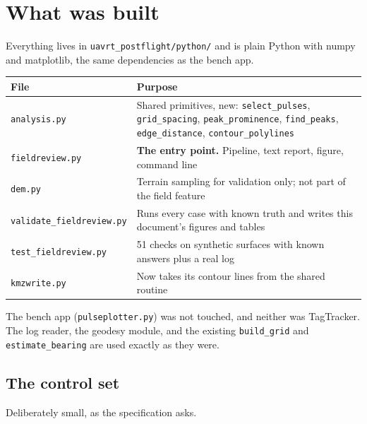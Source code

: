 \documentclass[11pt,a4paper]{article}
\newcommand{\code}[1]{\texttt{\small #1}}
\begin{document}
\section{What was built}

Everything lives in \code{uavrt\_postflight/python/} and is plain Python with numpy and
matplotlib, the same dependencies as the bench app.

\begin{center}\small
\begin{tabular}{@{}p{}p{}@{}}
\toprule
File & Purpose \\
\midrule
\code{analysis.py} & Shared primitives, new: \code{select\_pulses}, \code{grid\_spacing},
  \code{peak\_prominence}, \code{find\_peaks}, \code{edge\_distance}, \code{contour\_polylines} \\
\code{fieldreview.py} & \textbf{The entry point.} Pipeline, text report, figure, command line \\
\code{dem.py} & Terrain sampling for validation only; not part of the field feature \\
\code{validate\_fieldreview.py} & Runs every case with known truth and writes this document's figures and tables \\
\code{test\_fieldreview.py} & 51 checks on synthetic surfaces with known answers plus a real log \\
\code{kmzwrite.py} & Now takes its contour lines from the shared routine \\
\bottomrule
\end{tabular}
\end{center}

The bench app (\code{pulseplotter.py}) was not touched, and neither was TagTracker.
The log reader, the geodesy module, and the existing \code{build\_grid} and
\code{estimate\_bearing} are used exactly as they were.

\subsection{The control set}

Deliberately small, as the specification asks.
\end{document}
